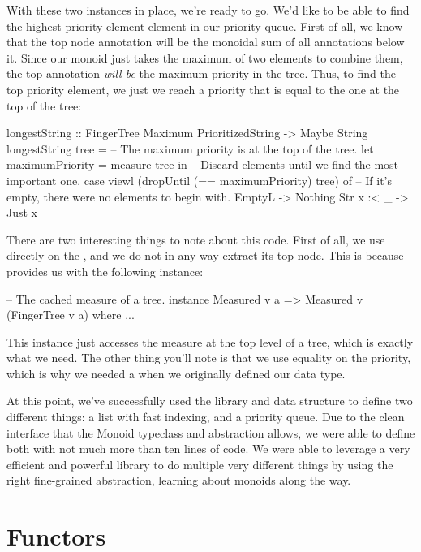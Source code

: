 With these two instances in place, we're ready to go. We'd like to be able to find the highest
priority element element in our priority queue. First of all, we know that the top node annotation
will be the monoidal sum of all annotations below it. Since our monoid just takes the maximum of two
elements to combine them, the top annotation \emph{will be} the maximum priority in the tree. Thus,
to find the top priority element, we just  we reach a priority that is equal to
the one at the top of the tree:
\begin{haskell}
longestString :: FingerTree Maximum PrioritizedString -> Maybe String
longestString tree = 
  -- The maximum priority is at the top of the tree.
  let maximumPriority = measure tree in
    -- Discard elements until we find the most important one.
    case viewl (dropUntil (== maximumPriority) tree) of
      -- If it's empty, there were no elements to begin with.
      EmptyL -> Nothing
      Str x :< _ -> Just x
\end{haskell}
There are two interesting things to note about this code. First of all, we use 
directly on the , and we do not in any way extract its top node. This is because
 provides us with the following instance:
\begin{haskell}
-- The cached measure of a tree.
instance Measured v a => Measured v (FingerTree v a) where ...
\end{haskell}
This instance just accesses the measure at the top level of a tree, which is exactly what we need.
The other thing you'll note is that we use equality on the priority, which is why we needed a
 when we originally defined our  data type.

At this point, we've successfully used the  library and data structure to define
two different things: a list with fast indexing, and a priority queue. Due to the clean interface
that the Monoid typeclass and abstraction allows, we were able to define both with not much more
than ten lines of code. We were able to leverage a very efficient and powerful library to do
multiple very different things by using the right fine-grained abstraction, learning about monoids
along the way.

\section{Functors}
\label{sec:functors}

